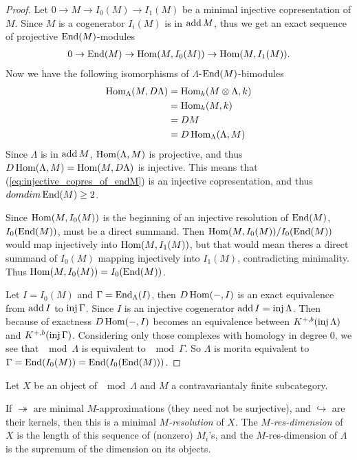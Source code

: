 \begin{prop}
\begin{proof}
		Let $0 \to M \to I_0(M) \to I_1(M)$ be a minimal injective copresentation of $M$. Since $M$ is a cogenerator $I_i(M)$ is in $\operatorname{add} M$, thus we get an exact sequence of projective $\operatorname{End}(M)$-modules
		\begin{align} \label{eq:injective_copres_of_endM}
		0 \to \operatorname{End}(M) \to \operatorname{Hom}(M, I_0(M)) \to \operatorname{Hom}(M, I_1(M)).
		\end{align}
		Now we have the following isomorphisms of $\Lambda$-$\operatorname{End}(M)$-bimodules
		\begin{align*}
		\operatorname{Hom}_\Lambda(M, D\Lambda) &=
		\operatorname{Hom}_k(M\otimes\Lambda, k) \\&=
		\operatorname{Hom}_k(M, k) \\&=
		DM \\&=
		D\operatorname{Hom}_\Lambda(\Lambda, M)
		\end{align*}
		Since $\Lambda$ is in $\operatorname{add} M$, $\operatorname{Hom}(\Lambda, M)$ is projective, and thus $D\operatorname{Hom}(\Lambda, M) = \operatorname{Hom}(M, D\Lambda)$ is injective. This means that (\ref{eq:injective_copres_of_endM}) is an injective copresentation, and thus $domdim\operatorname{End}(M) \geq 2$.
		
		Since $\operatorname{Hom}(M, I_0(M))$ is the beginning of an injective resolution of $\operatorname{End}(M)$, $I_0(\operatorname{End}(M))$, must be a direct summand. Then $\operatorname{Hom}(M, I_0(M)) / I_0(\operatorname{End}(M))$ would map injectively into $\operatorname{Hom}(M, I_1(M))$, but that would mean theres a direct summand of $I_0(M)$ mapping injectively into $I_1(M)$, contradicting minimality. Thus $\operatorname{Hom}(M, I_0(M)) = I_0(\operatorname{End}(M))$.
		
		Let $I=I_0(M)$ and $\Gamma = \operatorname{End}_\Lambda(I)$, then $D\operatorname{Hom}(-,I)$ is an exact equivalence from $\operatorname{add} I$ to $\operatorname{inj}\Gamma$. Since $I$ is an injective cogenerator $\operatorname{add} I = \operatorname{inj}\Lambda$. Then because of exactness $D\operatorname{Hom}(-,I)$ becomes an equivalence between $K^{+,b}(\operatorname{inj}\Lambda)$ and $K^{+,b}(\operatorname{inj}\Gamma)$. Considering only those complexes with homology in degree 0, we see that $\mod\Lambda$ is equivalent to $\mod\Gamma$. So $\Lambda$ is morita equivalent to $\Gamma = \operatorname{End}(I_0(M)) = \operatorname{End}(I_0(\operatorname{End}(M)))$.
	\end{proof}
\end{prop}

\begin{defn}
	Let $X$ be an object of $\mod\Lambda$ and $M$ a contravariantaly finite subcategory.
	\begin{center}
	\end{center}
	If $\twoheadrightarrow$ are minimal $M$-approximations (they need not be surjective), and $\hookrightarrow$ are their kernels, then this is a minimal \emph{$M$-resolution} of $X$. The \emph{$M$-res-dimension} of $X$ is the length of this sequence of (nonzero) $M_i$'s, and the $M$-res-dimension of $\Lambda$ is the supremum of the dimension on its objects.

\end{defn}

